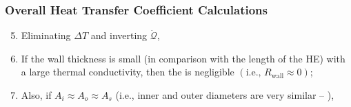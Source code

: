 \documentclass[10pt,compress,unknownkeysallowed]{beamer}
\begin{document}
\begin{frame}
  \frametitle{Overall Heat Transfer Coefficient Calculations}
     \begin{enumerate}\setcounter{enumi}{4}\scriptsize
        \item<1-> Eliminating $\Delta T$ and inverting $\dot{\mathcal{Q}}$,
        \item<2-> If the wall thickness is small (in comparison with the length of the HE) with a large thermal conductivity, then the  is negligible $\left(\text{i.e., }R_{\text{wall}} \approx 0\right)$;
        \item<3-> Also, if $A_{i}\approx A_{o} \approx A_{s}$ (i.e., inner and outer diameters are very similar -- ),
     \end{enumerate}


\end{frame}
\end{document}
